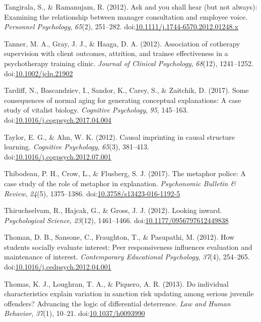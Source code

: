 \documentclass[english,man]{apa6}
\theoremstyle{definition}
\theoremstyle{definition}
\theoremstyle{definition}
\theoremstyle{remark}
\begin{document}
\hypertarget{ref-Tangirala2012}{}
Tangirala, S., \& Ramanujam, R. (2012). Ask and you shall hear (but not
always): Examining the relationship between manager consultation and
employee voice. \emph{Personnel Psychology}, \emph{65}(2), 251--282.
doi:\href{https://doi.org/10.1111/j.1744-6570.2012.01248.x}{10.1111/j.1744-6570.2012.01248.x}

\hypertarget{ref-Tanner2012}{}
Tanner, M. A., Gray, J. J., \& Haaga, D. A. (2012). Association of
cotherapy supervision with client outcomes, attrition, and trainee
effectiveness in a psychotherapy training clinic. \emph{Journal of
Clinical Psychology}, \emph{68}(12), 1241--1252.
doi:\href{https://doi.org/10.1002/jclp.21902}{10.1002/jclp.21902}

\hypertarget{ref-Tardiff2017}{}
Tardiff, N., Bascandziev, I., Sandor, K., Carey, S., \& Zaitchik, D.
(2017). Some consequences of normal aging for generating conceptual
explanations: A case study of vitalist biology. \emph{Cognitive
Psychology}, \emph{95}, 145--163.
doi:\href{https://doi.org/10.1016/j.cogpsych.2017.04.004}{10.1016/j.cogpsych.2017.04.004}

\hypertarget{ref-Taylor2012}{}
Taylor, E. G., \& Ahn, W. K. (2012). Causal imprinting in causal
structure learning. \emph{Cognitive Psychology}, \emph{65}(3), 381--413.
doi:\href{https://doi.org/10.1016/j.cogpsych.2012.07.001}{10.1016/j.cogpsych.2012.07.001}

\hypertarget{ref-Thibodeau2017}{}
Thibodeau, P. H., Crow, L., \& Flusberg, S. J. (2017). The metaphor
police: A case study of the role of metaphor in explanation.
\emph{Psychonomic Bulletin \& Review}, \emph{24}(5), 1375--1386.
doi:\href{https://doi.org/10.3758/s13423-016-1192-5}{10.3758/s13423-016-1192-5}

\hypertarget{ref-Thiruchselvam2012}{}
Thiruchselvam, R., Hajcak, G., \& Gross, J. J. (2012). Looking inward.
\emph{Psychological Science}, \emph{23}(12), 1461--1466.
doi:\href{https://doi.org/10.1177/0956797612449838}{10.1177/0956797612449838}

\hypertarget{ref-Thoman2012}{}
Thoman, D. B., Sansone, C., Fraughton, T., \& Pasupathi, M. (2012). How
students socially evaluate interest: Peer responsiveness influences
evaluation and maintenance of interest. \emph{Contemporary Educational
Psychology}, \emph{37}(4), 254--265.
doi:\href{https://doi.org/10.1016/j.cedpsych.2012.04.001}{10.1016/j.cedpsych.2012.04.001}

\hypertarget{ref-Thomas2013}{}
Thomas, K. J., Loughran, T. A., \& Piquero, A. R. (2013). Do individual
characteristics explain variation in sanction risk updating among
serious juvenile offenders? Advancing the logic of differential
deterrence. \emph{Law and Human Behavior}, \emph{37}(1), 10--21.
doi:\href{https://doi.org/10.1037/h0093990}{10.1037/h0093990}
\end{document}
